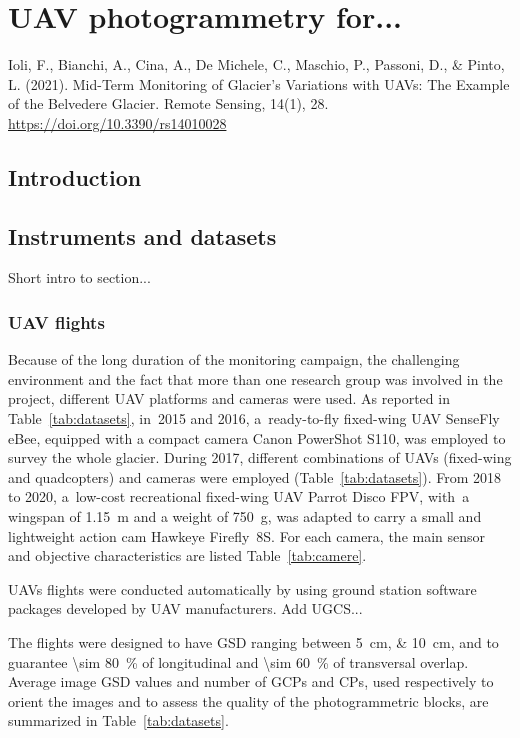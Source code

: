 \chapter{UAV photogrammetry for...}

\vfill


\noindent Ioli, F., Bianchi, A., Cina, A., De Michele, C., Maschio, P., Passoni, D., \& Pinto, L. (2021). Mid-Term Monitoring of Glacier’s Variations with UAVs: The Example of the Belvedere Glacier. Remote Sensing, 14(1), 28. \url{https://doi.org/10.3390/rs14010028}

\newpage

\section{Introduction}

\section{Instruments and datasets}

{\color{red} Short intro to section...}

\subsection{UAV flights}

Because of the long duration of the monitoring campaign, the challenging environment and the fact that more than one research group was involved in the project, different UAV platforms and cameras were used. 
As reported in Table~\ref{tab:datasets}, in~2015 and 2016, a~ready-to-fly fixed-wing UAV SenseFly eBee, equipped with a compact camera Canon PowerShot S110, was employed to survey the whole glacier. 
During 2017, different combinations of UAVs (fixed-wing and quadcopters) and cameras were employed (Table~\ref{tab:datasets}). 
From 2018 to 2020, a~low-cost recreational fixed-wing UAV Parrot Disco FPV, with~a wingspan of \SI{1.15}{\meter} and a weight of \SI{750}{\gram}, was adapted to carry a small and lightweight action cam Hawkeye Firefly~8S. 
For each camera, the main sensor and objective characteristics are listed Table~\ref{tab:camere}.

UAVs flights were conducted automatically by using ground station software packages developed by UAV manufacturers.
{\color{red} Add UGCS...}

The flights were designed to have GSD ranging between \qtylist{5;10}{\centi\meter}, and to guarantee \qty{\sim 80}{\percent} of longitudinal and \qty{\sim 60}{\percent} of transversal overlap. 
Average image GSD values and number of GCPs and CPs, used respectively to orient the images and to assess the quality of the photogrammetric blocks, are summarized in Table~\ref{tab:datasets}. 

